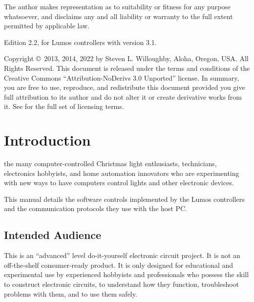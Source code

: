 \documentclass[letterpaper,twoside,onecolumn,openright,final]{memoir}
\begin{document}
The author makes  representation as to suitability or fitness for any purpose whatsoever, and disclaims any and all liability or warranty to the full extent permitted by applicable law.

\strut\vfill
\noindent Edition 2.2, for Lumos controllers with  version 3.1.

\smallskip


\noindent Copyright \copyright\ 2013, 2014, 2022 by Steven L. Willoughby,
Aloha, Oregon, USA.  All Rights Reserved.  
This document is released under the terms and conditions of the 
Creative Commons ``Attribution-NoDerivs 3.0 Unported'' license.  
In summary, you are free to use, reproduce, and redistribute this 
document provided you give full attribution to its author and do not
alter it or create derivative works from it.  See
 for the full
set of licensing terms.

\begin{center}
\end{center}

\newpage
\tableofcontents
\newpage
\listoffigures

\mainmatter

\chapter{Introduction}
 the many computer-controlled
Christmas light enthusiasts,  technicians, electronics hobbyists,
and home automation innovators who are experimenting with new ways to have computers
control lights and other electronic devices.

This manual details the software controls implemented by the Lumos controllers
and the communication protocols they use with the host PC.

\section{Intended Audience}
This is an ``advanced'' level do-it-yourself electronic circuit project.  It is not
an off-the-shelf consumer-ready product.  It is only designed for educational and experimental
use by experienced hobbyists and professionals who possess the skill to construct electronic
circuits, to understand how they function, troubleshoot problems with them, and to use them safely.
\end{document}
